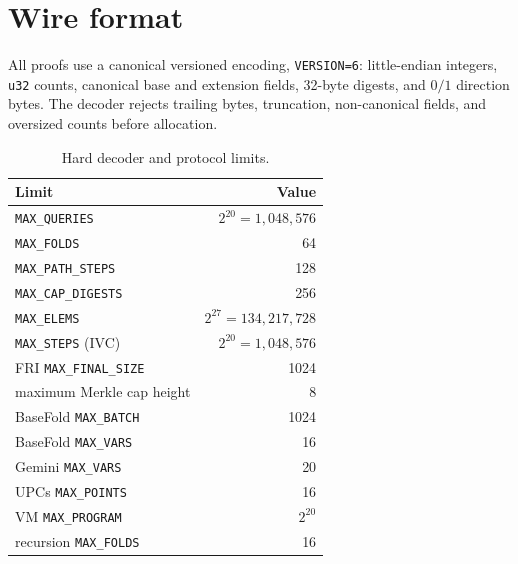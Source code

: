 \documentclass[11pt,a4paper]{article}
\begin{document}
\section{Wire format}

All proofs use a canonical versioned encoding, \texttt{VERSION=6}:
little-endian integers, \texttt{u32} counts, canonical base and extension
fields, 32-byte digests, and $0/1$ direction bytes. The decoder rejects
trailing bytes, truncation, non-canonical fields, and oversized counts before
allocation.

\begin{table}[h]
\centering
\small
\begin{tabular}{@{}lr@{}}
\toprule
Limit & Value \\
\midrule
\texttt{MAX\_QUERIES} & $2^{20}=1{,}048{,}576$ \\
\texttt{MAX\_FOLDS} & 64 \\
\texttt{MAX\_PATH\_STEPS} & 128 \\
\texttt{MAX\_CAP\_DIGESTS} & 256 \\
\texttt{MAX\_ELEMS} & $2^{27}=134{,}217{,}728$ \\
\texttt{MAX\_STEPS} (IVC) & $2^{20}=1{,}048{,}576$ \\
FRI \texttt{MAX\_FINAL\_SIZE} & 1024 \\
maximum Merkle cap height & 8 \\
BaseFold \texttt{MAX\_BATCH} & 1024 \\
BaseFold \texttt{MAX\_VARS} & 16 \\
Gemini \texttt{MAX\_VARS} & 20 \\
UPCs \texttt{MAX\_POINTS} & 16 \\
VM \texttt{MAX\_PROGRAM} & $2^{20}$ \\
recursion \texttt{MAX\_FOLDS} & 16 \\
\bottomrule
\end{tabular}
\caption{Hard decoder and protocol limits.}
\end{table}
\end{document}
